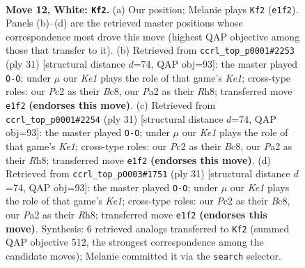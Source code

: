 \documentclass[11pt]{article}
\begin{document}
\clearpage

\begin{figure}[p]\centering
\begin{subfigure}{0.46\textwidth}\centering
\resizebox{\linewidth}{!}{%
\newchessgame
\chessboard[
  setfen={rnbk3r/1p1nq1p1/4p3/pNPpPp1p/5P2/1P5N/P1P3PP/R2QKB1R w KQ - 0 12},
  showmover=false,
  pgfstyle=straightmove, color=movearrow, markmove={e1-f2}
]}
\caption{}
\end{subfigure}\hfill
\begin{subfigure}{0.46\textwidth}\centering
\resizebox{\linewidth}{!}{%
\newchessgame
\chessboard[
  setfen={r1b1k2r/p2n1ppp/4p3/q2pP3/1ppP1P2/8/P1QNN1PP/R3KB1R b KQkq - 1 16},
  showmover=false,
  pgfstyle=straightmove, color=movearrow, markmove={e8-g8}
]}
\caption{}
\end{subfigure}
\\[4pt]
\begin{subfigure}{0.46\textwidth}\centering
\resizebox{\linewidth}{!}{%
\newchessgame
\chessboard[
  setfen={r1b1k2r/p2n1ppp/4p3/q2pP3/1ppP1P2/8/P1QNN1PP/R3KB1R b KQkq - 1 16},
  showmover=false,
  pgfstyle=straightmove, color=movearrow, markmove={e8-g8}
]}
\caption{}
\end{subfigure}\hfill
\begin{subfigure}{0.46\textwidth}\centering
\resizebox{\linewidth}{!}{%
\newchessgame
\chessboard[
  setfen={r1b1k2r/p2n1ppp/4p3/q2pP3/1ppP1P2/8/P1QNN1PP/R3KB1R b KQkq - 1 16},
  showmover=false,
  pgfstyle=straightmove, color=movearrow, markmove={e8-g8}
]}
\caption{}
\end{subfigure}
\caption{\textbf{Move 12, White: \texttt{Kf2}.} (a) Our position; Melanie plays \texttt{Kf2} (\texttt{e1f2}). Panels (b)--(d) are the retrieved master positions whose correspondence most drove this move (highest QAP objective among those that transfer to it). (b) Retrieved from \texttt{ccrl\_top\_p0001\#2253} (ply 31) [structural distance $d$=74, QAP obj=93]: the master played \texttt{O-O}; under $\mu$ our \emph{Ke1} plays the role of that game's \emph{Ke1}; cross-type roles: our \emph{P}c2 as their \emph{B}c8, our \emph{P}a2 as their \emph{R}h8; transferred move \texttt{e1f2} \textbf{(endorses this move)}. (c) Retrieved from \texttt{ccrl\_top\_p0001\#2254} (ply 31) [structural distance $d$=74, QAP obj=93]: the master played \texttt{O-O}; under $\mu$ our \emph{Ke1} plays the role of that game's \emph{Ke1}; cross-type roles: our \emph{P}c2 as their \emph{B}c8, our \emph{P}a2 as their \emph{R}h8; transferred move \texttt{e1f2} \textbf{(endorses this move)}. (d) Retrieved from \texttt{ccrl\_top\_p0003\#1751} (ply 31) [structural distance $d$=74, QAP obj=93]: the master played \texttt{O-O}; under $\mu$ our \emph{Ke1} plays the role of that game's \emph{Ke1}; cross-type roles: our \emph{P}c2 as their \emph{B}c8, our \emph{P}a2 as their \emph{R}h8; transferred move \texttt{e1f2} \textbf{(endorses this move)}. Synthesis: 6 retrieved analogs transferred to \texttt{Kf2} (summed QAP objective 512, the strongest correspondence among the candidate moves); Melanie committed it via the \texttt{search} selector.}
\label{fig:thought-m22}
\end{figure}
\end{document}
